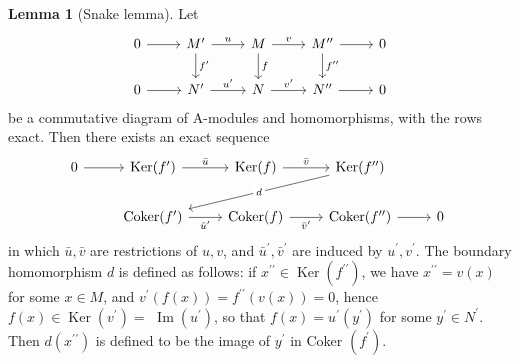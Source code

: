 \documentclass[a4paper,12pt]{article}
\theoremstyle{definition}
\newtheorem{lem}[defn]{Lemma}
\begin{document}
\begin{lem}[Snake lemma]
    Let
    \begin{equation*}
        \begin{tikzcd}
            0 & {M^{\prime}} & M & {M^{\prime\prime}} & 0 \\
            0 & {N^{\prime}} & N & {N^{\prime\prime}} & 0
            \arrow[from=1-1, to=1-2]
            \arrow["u", from=1-2, to=1-3]
            \arrow["v", from=1-3, to=1-4]
            \arrow[from=1-4, to=1-5]
            \arrow["{f^{\prime\prime}}", from=1-4, to=2-4]
            \arrow["f", from=1-3, to=2-3]
            \arrow["{f^{\prime}}", from=1-2, to=2-2]
            \arrow[from=2-1, to=2-2]
            \arrow["{u^{\prime}}", from=2-2, to=2-3]
            \arrow["{v^{\prime}}", from=2-3, to=2-4]
            \arrow[from=2-4, to=2-5]
        \end{tikzcd}
    \end{equation*}
    be a commutative diagram of A-modules and homomorphisms, with the rows exact. Then there exists an exact sequence
    \begin{equation*}
        \begin{tikzcd}
            0 & {\text{Ker}(f^{\prime})} & {\text{Ker}(f)} & {\text{Ker}(f^{\prime\prime})} \\
            & {\text{Coker}(f^{\prime})} & {\text{Coker}(f)} & {\text{Coker}(f^{\prime\prime})} & 0
            \arrow[from=1-1, to=1-2]
            \arrow["{\bar{u}}", from=1-2, to=1-3]
            \arrow["{\bar{v}}", from=1-3, to=1-4]
            \arrow["{\bar{u}^{\prime}}"', from=2-2, to=2-3]
            \arrow["{\bar{v}^{\prime}}"', from=2-3, to=2-4]
            \arrow[from=2-4, to=2-5]
            \arrow["d"{description}, from=1-4, to=2-2]
        \end{tikzcd}\
    \end{equation*}
    in which $\bar{u},\bar{v}$ are restrictions of $u, v$, and $\bar{u}^{\prime}, \bar{v}^{\prime}$ are induced by $u^{\prime}, v^{\prime}$.
    The boundary homomorphism $d$ is defined as follows: if $x^{\prime \prime} \in \operatorname{Ker}\left(f^{\prime \prime}\right)$, we have $x^{\prime \prime}=v(x)$ for some $x \in M$, and $v^{\prime}(f(x))=f^{\prime \prime}(v(x))=0$, hence $f(x) \in \operatorname{Ker}\left(v^{\prime}\right)=$ $\operatorname{Im}\left(u^{\prime}\right)$, so that $f(x)=u^{\prime}\left(y^{\prime}\right)$ for some $y^{\prime} \in N^{\prime}$. Then $d\left(x^{\prime \prime}\right)$ is defined to be the image of $y^{\prime}$ in Coker $\left(f^{\prime}\right)$.
    \label{lemma:snake lemma}
\end{lem}
\end{document}
